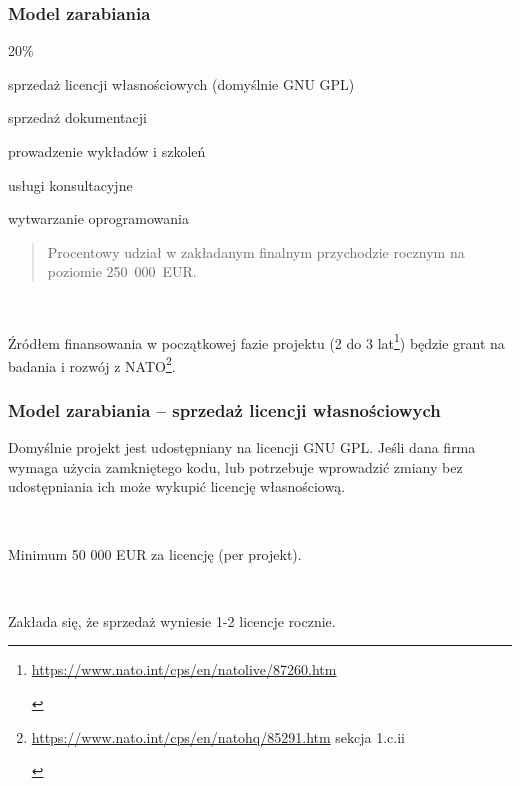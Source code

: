 \documentclass[aspectratio=169]{beamer}
\begin{document}
\begin{frame}
    \frametitle{Model zarabiania}

    \begin{labeling}{20\%}
        \item[20\%] sprzedaż licencji własnościowych (domyślnie GNU GPL)
        \item[4\%] sprzedaż dokumentacji
        \item[20\%] prowadzenie wykładów i szkoleń
        \item[8\%] usługi konsultacyjne
        \item[48\%] wytwarzanie oprogramowania
    \end{labeling}

    \begin{quote}
        \begin{tiny}
            Procentowy udział w zakładanym finalnym przychodzie rocznym na
            poziomie 250~000~EUR.
        \end{tiny}
    \end{quote}

    ~

    Źródłem finansowania w początkowej fazie projektu (2 do 3
    lat\footnote{\begin{tiny}\url{https://www.nato.int/cps/en/natolive/87260.htm}\end{tiny}})
    będzie grant na badania i rozwój z
    NATO\footnote{\begin{tiny}\url{https://www.nato.int/cps/en/natohq/85291.htm} sekcja 1.c.ii\end{tiny}}.
\end{frame}

\begin{frame}
    \frametitle{Model zarabiania -- sprzedaż licencji własnościowych}

    Domyślnie projekt jest udostępniany na licencji GNU GPL. Jeśli dana firma
    wymaga użycia zamkniętego kodu, lub potrzebuje wprowadzić zmiany bez
    udostępniania ich może wykupić licencję własnościową.

    ~

    Minimum 50 000 EUR za licencję (per projekt).

    ~

    Zakłada się, że sprzedaż wyniesie 1-2 licencje rocznie.
\end{frame}
\end{document}

